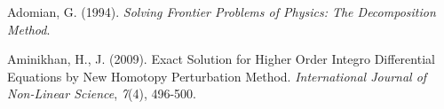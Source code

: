 \documentclass[12pt]{report}
\begin{document}
	\begin{description}
		\item Adomian, G. (1994). \textit{Solving Frontier Problems of Physics: The Decomposition Method}.
		
		\item Aminikhan, H., J. (2009). Exact Solution for Higher Order Integro Differential Equations by New Homotopy Perturbation Method. \textit{International Journal of Non-Linear Science}, \textit{7}(4), 496-500.	

		
	\end{description}
	
\end{document}
